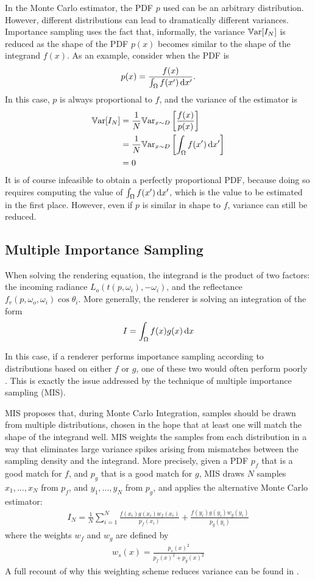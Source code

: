 In the Monte Carlo estimator, the PDF $p$ used can be an arbitrary distribution. However, different distributions can lead to dramatically different variances. Importance sampling uses the fact that, informally, the variance $\mathbb{V}\text{ar}[I_N]$ is reduced as the shape of the PDF $p(x)$ becomes similar to the shape of the integrand $f(x)$. As an example, consider when the PDF is 
$$ 
p(x)=\frac{f(x)}{\int_\Omega f(x') \,\mathrm{d} x'}.
$$ 
In this case, $p$ is always proportional to $f$, and the variance of the estimator is
\begin{align*}
\mathbb{V}\text{ar}[I_N]
&= \frac{1}{N}\mathbb{V}\text{ar}_{x\sim D}\left[\frac{f(x)}{p(x)}\right]\\
&= \frac{1}{N}\mathbb{V}\text{ar}_{x\sim D}\left[\int_\Omega f(x') \,\mathrm{d} x'\right]\\
&=0
\end{align*}
It is of course infeasible to obtain a perfectly proportional PDF, because doing so requires computing the value of $\int_\Omega f(x') \,\mathrm{d} x'$, which is the value to be estimated in the first place. However, even if $p$ is similar in shape to $f$, variance can still be reduced.

\subsection{Multiple Importance Sampling}
\label{subsection MIS}
When solving the rendering equation, the integrand is the product of two factors: the incoming radiance $L_o(t(p,\omega_i),-\omega_i)$, and the reflectance $f_r(p,\omega_o,\omega_i)\cos\theta_i$. More generally, the renderer is solving an integration of the form
$$
I = \int_\Omega f(x)g(x)\,\mathrm{d} x
$$

In this case, if a renderer performs importance sampling according to distributions based on either $f$ or $g$, one of these two would often perform poorly \cite{pharr2016physically}. This is exactly the issue addressed by the technique of multiple importance sampling (MIS).

MIS proposes that, during Monte Carlo Integration, samples should be drawn from multiple distributions, chosen in the hope that at least one will match the shape of the integrand well. MIS weights the samples from each distribution in a way that eliminates large variance spikes arising from mismatches between the sampling density and the integrand. More precisely, given a PDF $p_f$ that is a good match for $f$, and $p_g$ that is a good match for $g$, MIS draws $N$ samples $x_1,...,x_N$ from $p_f$, and $y_1,...,y_N$ from $p_g$, and applies the alternative Monte Carlo estimator:
\begin{align}
    I_N = \frac{1}{N} \sum_{i=1}^{N} \frac{f(x_i)g(x_i)w_f(x_i)}{p_f(x_i)} + \frac{f(y_i)g(y_i)w_g(y_i)}{p_g(y_i)}
    \label{MIS}
\end{align}
where the weights $w_f$ and $w_g$ are defined by
\begin{align*}
    w_s(x) = \frac{p_s(x)^2}{p_f(x)^2+p_g(x)^2}
\end{align*}
A full recount of why this weighting scheme reduces variance can be found in \cite{pharr2016physically}. 

